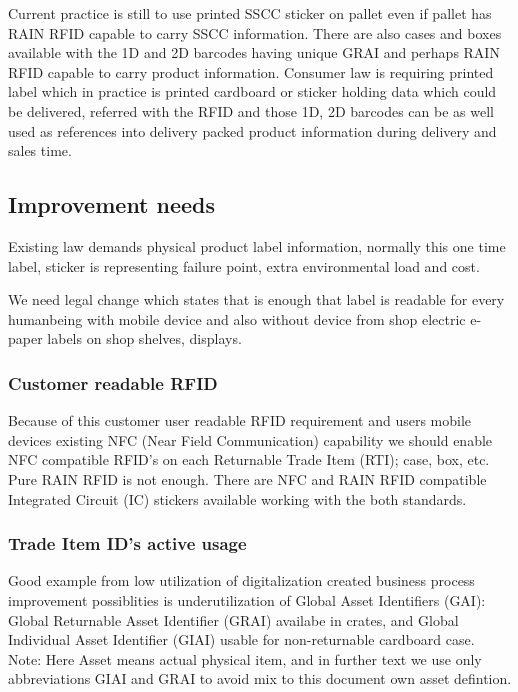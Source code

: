 Current practice is still to use printed SSCC sticker on pallet even if pallet
has RAIN RFID capable to carry SSCC information. There are also cases and boxes
available with the 1D and 2D barcodes having unique GRAI and perhaps RAIN RFID
capable to carry product information. Consumer law is requiring printed label
which in practice is printed cardboard or sticker holding data which could be
delivered, referred with the RFID and those 1D, 2D barcodes can be as well used
as references into delivery packed product information during delivery and
sales time.

\subsection{Improvement needs}
\label{improvement_needs}

Existing law demands physical product label information, normally this one time
label, sticker is representing failure point, extra environmental load and cost.

We need legal change which states that is enough that label is readable for
every humanbeing with mobile device and also without device from shop electric
e-paper labels on shop shelves, displays.

\subsubsection{Customer readable RFID}
\label{improvement_NFC_RFID}

Because of this customer user readable RFID requirement and users mobile devices
existing NFC (Near Field Communication) capability we should enable NFC compatible
RFID's on each Returnable Trade Item (RTI); case, box, etc. Pure RAIN RFID is not
enough. There are NFC and RAIN RFID compatible Integrated Circuit (IC)\cite{RAINFC}
stickers available\cite{RAINFC_label} working with the both standards.

\subsubsection{Trade Item ID's active usage}
\label{improvement_1D_2D_RFID_usage}

Good example from low utilization of digitalization created business process
improvement possiblities is underutilization of Global Asset Identifiers (GAI):
Global Returnable Asset Identifier (GRAI)
\cite{GRAI}\cite{IFCO}\cite{EUROPOOL}
availabe in crates, and Global Individual Asset Identifier (GIAI)
\cite{GIAI}\cite{CajoMakeBright} usable for non-returnable cardboard case.
Note: Here Asset means actual physical item, and in further text we use only
abbreviations GIAI and GRAI to avoid mix to this document own asset defintion.

